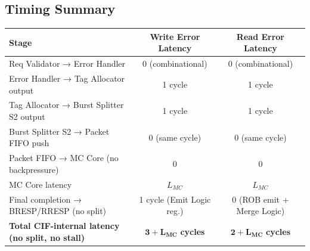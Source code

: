 \documentclass[11pt,a4paper]{article}
\begin{document}
\subsection{Timing Summary}

\begin{center}
\begin{tabular}{lcc}
\toprule
\textbf{Stage} & \textbf{Write Error Latency} & \textbf{Read Error Latency} \\
\midrule
Req Validator → Error Handler & 0 (combinational) & 0 (combinational) \\
Error Handler → Tag Allocator output & 1 cycle & 1 cycle \\
Tag Allocator → Burst Splitter S2 output & 1 cycle & 1 cycle \\
Burst Splitter S2 → Packet FIFO push & 0 (same cycle) & 0 (same cycle) \\
Packet FIFO → MC Core (no backpressure) & 0 & 0 \\
MC Core latency & $L_{MC}$ & $L_{MC}$ \\
Final completion → BRESP/RRESP (no split) & 1 cycle (Emit Logic reg.) & 0 (ROB emit + Merge Logic) \\
\midrule
\textbf{Total CIF-internal latency (no split, no stall)} & $\mathbf{3 + L_{MC}}$ \textbf{cycles} & $\mathbf{2 + L_{MC}}$ \textbf{cycles} \\
\bottomrule
\end{tabular}
\end{center}
\end{document}
